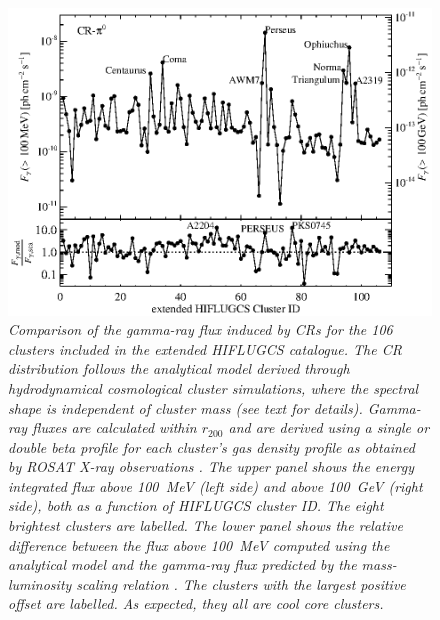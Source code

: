 \documentclass[10pt,aps,pra,reprint,amsmath,amsfonts,amssymb,showpacs,nofootinbib,floatfix]{revtex4-1}
\newcommand{\rvir}{r_{200}}
\begin{document}
\begin{figure}%
\begin{minipage}{2.0\columnwidth}
 \includegraphics[width=0.99\columnwidth]{figures/Flux.comp.CR.eps}
 \caption{\it Comparison of the gamma-ray flux induced by CRs for the
   106 clusters included in the extended HIFLUGCS catalogue. The CR
   distribution follows the analytical model derived through
   hydrodynamical cosmological cluster simulations, where the spectral
   shape is independent of cluster mass \protect
   \cite{2010MNRAS.409..449P} (see text for details). Gamma-ray fluxes
   are calculated within $\rvir$ and are derived using a single or
   double beta profile for each cluster's gas density profile as
   obtained by ROSAT X-ray observations
   \cite{2007A&A...466..805C}. The upper panel shows the energy
   integrated flux above 100~MeV (left side) and above 100~GeV (right
   side), both as a function of HIFLUGCS cluster ID. The eight
   brightest clusters are labelled. The lower panel shows the relative
   difference between the flux above 100~MeV computed using the
   analytical model and the gamma-ray flux predicted by the
   mass-luminosity scaling relation \cite{2010MNRAS.409..449P}. The
   clusters with the largest positive offset are labelled. As
   expected, they all are cool core clusters.}
 \label{fig19}
\end{minipage}
\end{figure}
\end{document}
